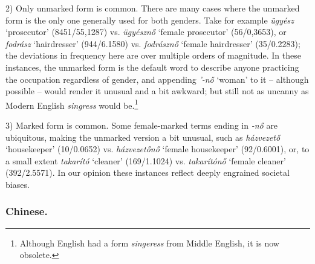 \documentclass[runningheads]{llncs}
\begin{document}
2) Only unmarked form is common. There are many cases where the unmarked form is the only one generally used for both genders. Take for example \textit{ügyész} `prosecutor' (8451/55,1287) vs. \textit{ügyésznő} `female prosecutor' (56/0,3653), or \textit{fodrász} `hairdresser' (944/6.1580) vs. \textit{fodrásznő} `female hairdresser' (35/0.2283); the deviations in frequency here are over multiple orders of magnitude. In these instances, the unmarked form is the default word to describe anyone practicing the occupation regardless of gender, and appending \textit{'-nő} `woman' to it -- although possible -- would render it unusual and a bit awkward; but still not as uncanny as Modern English \textit{singress} would be.\footnote{Although English had a form \textit{singeress} from Middle English, it is now obsolete.}

3) Marked form is common. Some female-marked terms ending in \textit{-nő} are ubiquitous, making the unmarked version a bit unusual, such as \textit{házvezető} `housekeeper' (10/0.0652) vs. \textit{házvezetőnő} `female housekeeper' (92/0.6001), or, to a small extent \textit{takarító} `cleaner' (169/1.1024) vs. \textit{takarítónő} `female cleaner' (392/2.5571). In our opinion these instances reflect deeply engrained societal biases.

\subsubsection{Chinese.}
\end{document}
